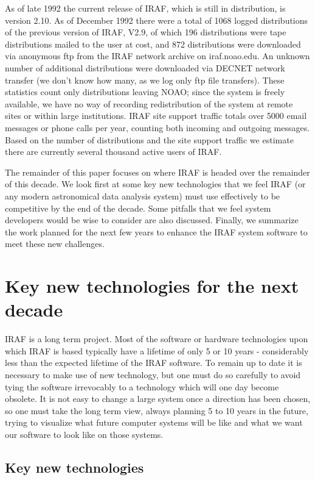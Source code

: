 As of late 1992 the current release of IRAF, which is still in distribution,
is version 2.10.  As of December 1992 there were a total of 1068 logged
distributions of the previous version of IRAF, V2.9, of which 196
distributions were tape distributions mailed to the user at cost, and 872
distributions were downloaded via anonymous ftp from the IRAF network
archive on iraf.noao.edu.  An unknown number of additional distributions
were downloaded via DECNET network transfer (we don't know how many, as we
log only ftp file transfers).  These statistics count only distributions
leaving NOAO; since the system is freely available, we have no way of
recording redistribution of the system at remote sites or within large
institutions.  IRAF site support traffic totals over 5000 email messages or
phone calls per year, counting both incoming and outgoing messages.  Based
on the number of distributions and the site support traffic we estimate
there are currently several thousand active users of IRAF.

The remainder of this paper focuses on where IRAF is headed over the
remainder of this decade.  We look first at some key new technologies that
we feel IRAF (or any modern astronomical data analysis system) must use
effectively to be competitive by the end of the decade.  Some pitfalls that
we feel system developers would be wise to consider are also discussed.
Finally, we summarize the work planned for the next few years to enhance the
IRAF system software to meet these new challenges.

\section {Key new technologies for the next decade}

IRAF is a long term project.  Most of the software or hardware technologies
upon which IRAF is based typically have a lifetime of only 5 or 10 years -
considerably less than the expected lifetime of the IRAF software.  To
remain up to date it is necessary to make use of new technology, but one
must do so carefully to avoid tying the software irrevocably to a technology
which will one day become obsolete.  It is not easy to change a large system
once a direction has been chosen, so one must take the long term view,
always planning 5 to 10 years in the future, trying to visualize what future
computer systems will be like and what we want our software to look like on
those systems.

\subsection {Key new technologies}

